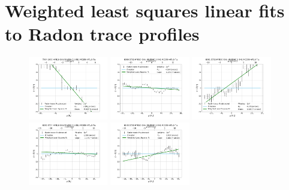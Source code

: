 \onecolumn
\newpage

\section{Weighted least squares linear fits to Radon trace profiles}
\label{sec:WLS-fits}

\begin{figure}
    \centering
    \includegraphics[width=0.31\textwidth]{Images/WLSFITS/CPSB/7964-1902.png}
    \includegraphics[width=0.31\textwidth]{Images/WLSFITS/CPSB/8080-3702.png}
    \includegraphics[width=0.31\textwidth]{Images/WLSFITS/CPSB/8081-3702.png}
    \includegraphics[width=0.31\textwidth]{Images/WLSFITS/CPSB/8082-3704.png}
    \includegraphics[width=0.31\textwidth]{Images/WLSFITS/CPSB/8143-3703.png}

\end{figure}

